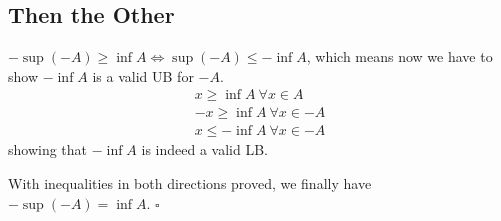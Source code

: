 \documentclass[12pt]{article}
\begin{document}
\subsection{Then the Other}

$-\sup(-A) \ge \inf A \iff \sup(-A) \le -\inf A$,
which means now we have to show $-\inf A$ is a valid UB for $-A$.
\begin{gather*}
      x \ge \inf A\ \forall x \in A \\
      -x \ge \inf A\ \forall x \in -A \\
      x \le -\inf A\ \forall x \in -A
\end{gather*}
showing that $-\inf A$ is indeed a valid LB.

With inequalities in both directions proved, we finally have $-\sup(-A)=\inf A$. $\square$
\end{document}
